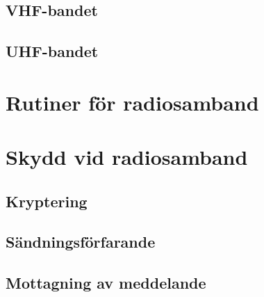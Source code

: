 \documentclass[12ypt,swedish,a4paper]{report}
\begin{document}
\section{VHF-bandet}

\section{UHF-bandet}

\chapter{Rutiner för radiosamband}

\chapter{Skydd vid radiosamband}

\section{Kryptering}

\section{Sändningsförfarande}

\section{Mottagning av meddelande}
\end{document}
